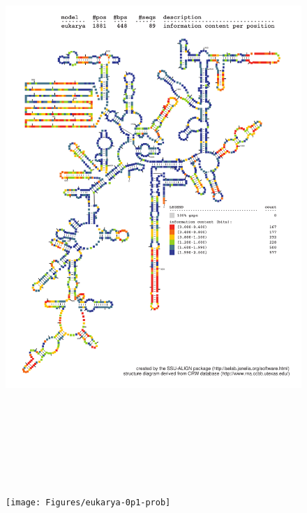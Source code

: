 \newpage

\begin{figure}
\includegraphics[height=8.5in]{Figures/eukarya-0p1-info}
\label{fig:eukinfo}
\end{figure}

\newpage

\begin{figure}
\texttt{[image: Figures/eukarya-0p1-prob]}
\label{fig:eukinfo}
\end{figure}

\newpage


